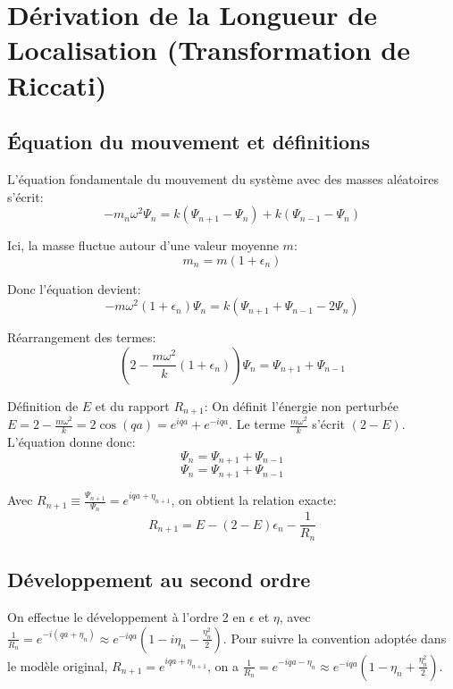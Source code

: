 \chapter{Dérivation de la Longueur de Localisation (Transformation de Riccati)}\label{annexe:lyapunov-derivation}

\section{Équation du mouvement et définitions}
L'équation fondamentale du mouvement du système avec des masses aléatoires s'écrit:
\begin{equation}
    -m_n\omega^2 \Psi_n = k(\Psi_{n+1} - \Psi_n) + k(\Psi_{n-1} - \Psi_n)
\end{equation}

Ici, la masse fluctue autour d'une valeur moyenne $m$:
\begin{equation}
    m_n = m(1+\epsilon_n)
\end{equation}

Donc l'équation devient:
\begin{equation}
    -m\omega^2(1+\epsilon_n) \Psi_n = k(\Psi_{n+1} + \Psi_{n-1} - 2\Psi_n)
\end{equation}

Réarrangement des termes:
\begin{equation}
    \left( 2 - \frac{m\omega^2}{k}(1+\epsilon_n) \right) \Psi_n = \Psi_{n+1} + \Psi_{n-1}
\end{equation}

Définition de $E$ et du rapport $R_{n+1}$:
On définit l'énergie non perturbée $E = 2 - \frac{m\omega^2}{k} = 2 \cos(qa) = e^{iqa} + e^{-iqa}$.
Le terme $\frac{m\omega^2}{k}$ s'écrit $(2-E)$. L'équation donne donc:
\begin{equation}
    [ 2 - (2-E)(1+\epsilon_n) ] \Psi_n = \Psi_{n+1} + \Psi_{n-1}
\end{equation}
\begin{equation}
    [ E - (2-E)\epsilon_n ] \Psi_n = \Psi_{n+1} + \Psi_{n-1}
\end{equation}

Avec $R_{n+1} \equiv \frac{\Psi_{n+1}}{\Psi_n} = e^{iqa + \eta_{n+1}}$, on obtient la relation exacte:
\begin{equation}
    R_{n+1} = E - (2-E)\epsilon_n - \frac{1}{R_n}
\end{equation}

\section{Développement au second ordre}
On effectue le développement à l'ordre 2 en $\epsilon$ et $\eta$, avec $\frac{1}{R_n} = e^{-i(qa+\eta_n)} \approx e^{-iqa}(1 - i\eta_n - \frac{\eta_n^2}{2})$.
Pour suivre la convention adoptée dans le modèle original, $R_{n+1} = e^{iqa + \eta_{n+1}}$, on a $\frac{1}{R_n} = e^{-iqa-\eta_n} \approx e^{-iqa}(1 - \eta_n + \frac{\eta_n^2}{2})$.

